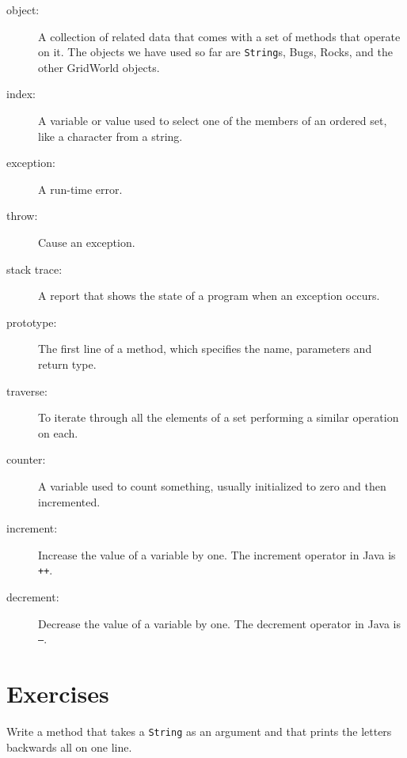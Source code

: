\begin{description}

\item[object:] A collection of related data that comes with a set of
methods that operate on it.  The objects we have used so far are
{\tt String}s, Bugs, Rocks, and the other GridWorld objects.

\item[index:]  A variable or value used to select one of the
members of an ordered set, like a character from a string.

\item[exception:] A run-time error.

\item[throw:] Cause an exception.

\item[stack trace:] A report that shows the state of a program
when an exception occurs.

\item[prototype:]  The first line of a method, which specifies
the name, parameters and return type.

\item[traverse:]  To iterate through all the elements of a set
performing a similar operation on each.

\item[counter:]  A variable used to count something, usually
initialized to zero and then incremented.

\item[increment:]  Increase the value of a variable by one.
The increment operator in Java is {\tt ++}.

\item[decrement:]  Decrease the value of a variable by one.
The decrement operator in Java is {\tt --}.



\end{description}


\section{Exercises}

\begin{exercise}
Write a method that takes a {\tt String}
as an argument and that prints the letters backwards all on
one line.
\end{exercise}

